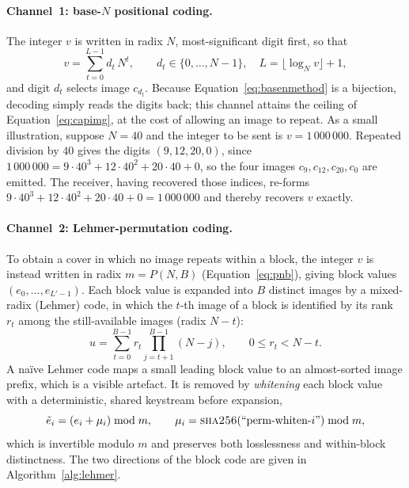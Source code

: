 \documentclass[11pt]{article}
\theoremstyle{definition}
\newcommand{\Eqn}[1]{Equation~\eqref{#1}}
\begin{document}
\paragraph{Channel~1: base-$N$ positional coding.}
The integer $v$ is written in radix $N$, most-significant digit first, so that
\begin{equation}
  v=\sum_{t=0}^{L-1} d_t\,N^{t},\qquad d_t\in\{0,\dots,N-1\},\quad
  L=\lfloor\log_N v\rfloor+1 ,
  \label{eq:basenmethod}
\end{equation}
and digit $d_t$ selects image $c_{d_t}$. Because \Eqn{eq:basenmethod} is a
bijection, decoding simply reads the digits back; this channel attains the ceiling
of \Eqn{eq:capimg}, at the cost of allowing an image to repeat. As a small
illustration, suppose $N=40$ and the integer to be sent is $v=1\,000\,000$. Repeated
division by $40$ gives the digits $(9,12,20,0)$, since
$1\,000\,000 = 9\cdot40^{3} + 12\cdot40^{2} + 20\cdot40 + 0$, so the four images
$c_9,c_{12},c_{20},c_0$ are emitted. The receiver, having recovered those indices,
re-forms $9\cdot40^{3}+12\cdot40^{2}+20\cdot40+0=1\,000\,000$ and thereby recovers
$v$ exactly.

\paragraph{Channel~2: Lehmer-permutation coding.}
To obtain a cover in which no image repeats within a block, the integer $v$ is
instead written in radix $m=P(N,B)$ (\Eqn{eq:pnb}), giving block values
$(e_0,\dots,e_{L'-1})$. Each block value is expanded into $B$ distinct images by a
mixed-radix (Lehmer) code, in which the $t$-th image of a block is identified by
its rank $r_t$ among the still-available images (radix $N-t$):
\begin{equation}
  u=\sum_{t=0}^{B-1} r_t \!\!\prod_{j=t+1}^{B-1}\!\!(N-j),\qquad 0\le r_t<N-t .
  \label{eq:lehmermethod}
\end{equation}
A na\"ive Lehmer code maps a small leading block value to an almost-sorted image
prefix, which is a visible artefact. It is removed by \emph{whitening} each block
value with a deterministic, shared keystream before expansion,
\begin{equation}
  \tilde e_i=\left(e_i+\mu_i\right)\bmod m,\qquad
  \mu_i=\textsc{sha256}\!\left(\text{``perm-whiten-}i\text{''}\right)\bmod m ,
  \label{eq:whitenmethod}
\end{equation}
which is invertible modulo $m$ and preserves both losslessness and within-block
distinctness. The two directions of the block code are given in
Algorithm~\ref{alg:lehmer}.
\end{document}
